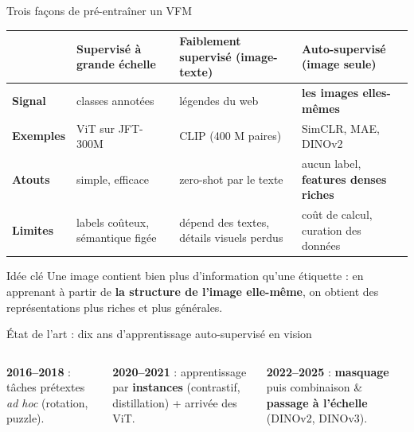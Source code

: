 \documentclass[aspectratio=169,10pt]{beamer}
\newcommand{\src}[1]{\par\vfill\hfill{\tiny\color{grisE}#1}}
\begin{document}
\begin{frame}{Trois façons de pré-entraîner un VFM}
  \small
  \begin{tabularx}{\linewidth}{@{}>{\bfseries}l L L L@{}}
    \toprule
     & \textcolor{grisE}{Supervisé à grande échelle} & \textcolor{violetE}{Faiblement supervisé (image-texte)} & \textcolor{vertE}{Auto-supervisé (image seule)}\\
    \midrule
    Signal & classes annotées & légendes du web & \textbf{les images elles-mêmes}\\
    Exemples & ViT sur JFT-300M & CLIP (400 M paires) & SimCLR, MAE, DINOv2\\
    Atouts & simple, efficace & zero-shot par le texte & aucun label, \textbf{features denses riches}\\
    Limites & labels coûteux, \newline sémantique figée & dépend des textes, \newline détails visuels perdus & coût de calcul, \newline curation des données\\
    \bottomrule
  \end{tabularx}
  \vspace{4mm}
  \begin{block}{Idée clé}
    Une image contient bien plus d'information qu'une étiquette : en apprenant à partir de \textbf{la structure de l'image elle-même}, on obtient des représentations plus riches et plus générales.
  \end{block}
\end{frame}

\begin{frame}{État de l'art : dix ans d'apprentissage auto-supervisé en vision}
  \centering
  \vspace{2mm}
  \resizebox{\linewidth}{!}{}
  \vspace{3mm}
  \begin{columns}[T]
    \begin{column}{0.32\textwidth}\footnotesize \textbf{2016--2018} : tâches prétextes \textit{ad hoc} (rotation, puzzle).\end{column}
    \begin{column}{0.32\textwidth}\footnotesize \textbf{2020--2021} : apprentissage par \textbf{instances} (contrastif, distillation) + arrivée des ViT.\end{column}
    \begin{column}{0.32\textwidth}\footnotesize \textbf{2022--2025} : \textbf{masquage} puis combinaison \& \textbf{passage à l'échelle} (DINOv2, DINOv3).\end{column}
  \end{columns}
  \src{\citet{noroozi2016jigsaw,gidaris2018rotation,he2020moco,chen2020simclr,caron2021dino,he2022mae,oquab2024dinov2,simeoni2025dinov3}}
\end{frame}
\end{document}
